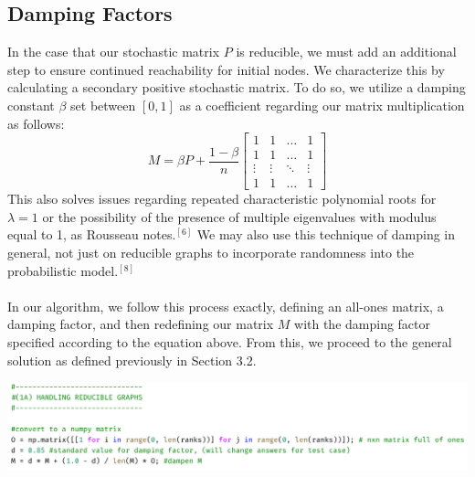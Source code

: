\documentclass{article}
\begin{document}
    \subsection{Damping Factors}
    In the case that our stochastic matrix $P$ is reducible, we must add an additional step to ensure continued reachability for initial nodes. We characterize this by calculating a secondary positive stochastic matrix. To do so, we utilize a damping constant $\beta$ set between $[0,1]$ as a coefficient regarding our matrix multiplication as follows: 
    $$
    M = \beta P + \frac{1-\beta}{n} \begin{bmatrix} 1 & 1 & \ldots & 1 \\ 1 & 1 & \ldots & 1 \\ \vdots & \vdots & \ddots & \vdots \\ 1 & 1 & \ldots & 1 \end{bmatrix}
    $$
    This also solves issues regarding repeated characteristic polynomial roots for $\lambda = 1$ or the possibility of the presence of multiple eigenvalues with modulus equal to 1, as Rousseau notes.$^{[6]}$ We may also use this technique of damping in general, not just on reducible graphs to incorporate randomness into the probabilistic model.$^{[8]}$
    \\\\
    \noindent
    In our algorithm, we follow this process exactly, defining an all-ones matrix, a damping factor, and then redefining our matrix $M$ with the damping factor specified according to the equation above. From this, we proceed to the general solution as defined previously in Section 3.2.
    \begin{center}
        \includegraphics[scale=.5]{snip1A}
    \end{center}
    
\end{document}
